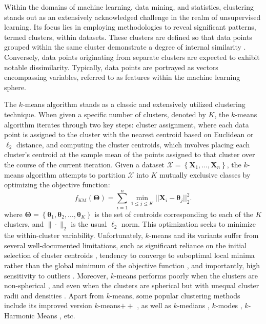 \documentclass{article}
\newcommand{\bX}{\boldsymbol{X}}
\newcommand{\btheta}{\boldsymbol{\theta}}
\newcommand{\bTheta}{\boldsymbol{\Theta}}
\begin{document}
Within the domains of machine learning, data mining, and statistics, clustering stands out as an extensively acknowledged challenge in the realm of unsupervised learning. Its focus lies in employing methodologies to reveal significant patterns, termed clusters, within datasets. These clusters are defined so that data points grouped within the same cluster demonstrate a degree of internal similarity \cite{Xu2015}. Conversely, data points originating from separate clusters are expected to exhibit notable dissimilarity. Typically, data points are portrayed as vectors encompassing variables, referred to as features within the machine learning sphere.

The $k$-means algorithm \cite{llyod-kmeans} stands as a classic and extensively utilized clustering technique. When given a specific number of clusters, denoted by $K$, the $k$-means algorithm iterates through two key steps: cluster assignment, where each data point is assigned to the cluster with the nearest centroid based on Euclidean or $\ell_2$ distance, and computing the cluster centroids, which involves placing each cluster's centroid at the sample mean of the points assigned to that cluster over the course of the current iteration. Given a dataset $\mathcal{X}=\left\{{\bX}_1, \ldots, {\bX}_n\right\}$, the $k$-means algorithm attempts to partition $\mathcal{X}$ into $K$ mutually exclusive classes by optimizing the objective function: 
\begin{equation}
    f_{\operatorname{KM}}(\bTheta) = \sum_{i=1}^n \displaystyle\min_{1 \leq j \leq K} ||\bX_i-\btheta_j||_2^2.
\end{equation}
where $\bTheta=\left\{\btheta_1, \btheta_2, \ldots, \btheta_K\right\}$ is the set of centroids corresponding to each of the $K$ clusters, and $\|\cdot\|_2$ is the usual $\ell_2$ norm. This optimization seeks to minimize the within-cluster variability.
Unfortunately, $k$-means and its variants suffer from several well-documented limitations, such as significant reliance on the initial selection of cluster centroids \cite{pmlr-v70-bachem17b}, tendency to converge to suboptimal local minima rather than the global minimum of the objective function \cite{xu-lange-2019}, and importantly, high sensitivity to outliers \cite{K-means-outliers}. Moreover, $k$-means performs poorly when the clusters are non-spherical \cite{spectral-andrew-ng}, and even when the clusters are spherical but with unequal cluster radii and densities \cite{Raykov2016-mg}. Apart from $k$-means, some popular clustering methods include its improved version $k$-means$++$ \cite{Arthur2007kmeansTA}, as well as $k$-medians \cite{bradley-k-median,k-median}, $k$-modes \cite{Chaturvedi2001}, $k$-Harmonic Means \cite{Zhang-1999-KHM}, etc.
\end{document}
